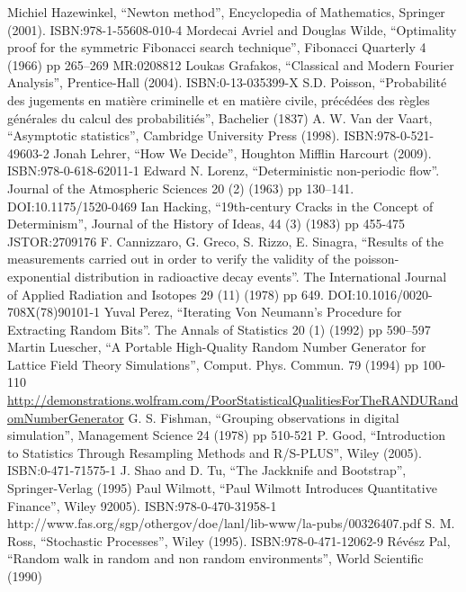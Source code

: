 \documentclass[justified,sixbynine]{tufte-book}
\theoremstyle{plain}%
\theoremstyle{definition}
\theoremstyle{remark}
\begin{document}
\begin{thebibliography}{999}
 Michiel Hazewinkel, ``Newton method'', Encyclopedia of Mathematics, Springer (2001). ISBN:978-1-55608-010-4
 Mordecai Avriel and Douglas Wilde, ``Optimality proof for the symmetric Fibonacci search technique'', Fibonacci Quarterly 4 (1966) pp 265–269 MR:0208812
 Loukas Grafakos, ``Classical and Modern Fourier Analysis'', Prentice-Hall (2004). ISBN:0-13-035399-X
 S.D. Poisson, ``Probabilité des jugements en matière criminelle et en matière civile, précédées des règles générales du calcul des probabilitiés'', Bachelier (1837)
 A. W. Van der Vaart, ``Asymptotic statistics'', Cambridge University Press (1998). ISBN:978-0-521-49603-2
 Jonah Lehrer, ``How We Decide'', Houghton Mifflin Harcourt (2009). ISBN:978-0-618-62011-1
 Edward N. Lorenz, ``Deterministic non-periodic flow''. Journal of the Atmospheric Sciences 20 (2) (1963) pp 130–141. DOI:10.1175/1520-0469
 Ian Hacking, ``19th-century Cracks in the Concept of Determinism'', Journal of the History of Ideas, 44 (3) (1983) pp 455-475 JSTOR:2709176
 F. Cannizzaro, G. Greco, S. Rizzo, E. Sinagra, ``Results of the measurements carried out in order to verify the validity of the poisson-exponential distribution in radioactive decay events''. The International Journal of Applied Radiation and Isotopes 29 (11) (1978) pp 649. DOI:10.1016/0020-708X(78)90101-1
 Yuval Perez, ``Iterating Von Neumann's Procedure for Extracting Random Bits''. The Annals of Statistics 20 (1) (1992) pp 590–597
 Martin Luescher, ``A Portable High-Quality Random Number Generator for Lattice Field Theory Simulations'', Comput. Phys. Commun. 79 (1994) pp 100-110
 \url{http://demonstrations.wolfram.com/PoorStatisticalQualitiesForTheRANDURandomNumberGenerator}
 G. S. Fishman, ``Grouping observations in digital simulation'', Management Science 24 (1978) pp 510-521
 P. Good, ``Introduction to Statistics Through Resampling Methods and R/S-PLUS'', Wiley (2005). ISBN:0-471-71575-1
 J. Shao and D. Tu, ``The Jackknife and Bootstrap'', Springer-Verlag (1995)
 Paul Wilmott, ``Paul Wilmott Introduces Quantitative Finance'', Wiley 92005). ISBN:978-0-470-31958-1
 http://www.fas.org/sgp/othergov/doe/lanl/lib-www/la-pubs/00326407.pdf
 S. M. Ross, ``Stochastic Processes'', Wiley (1995). ISBN:978-0-471-12062-9
 Révész Pal, ``Random walk in random and non random environments'', World Scientific (1990)

\end{thebibliography}
\end{document}

